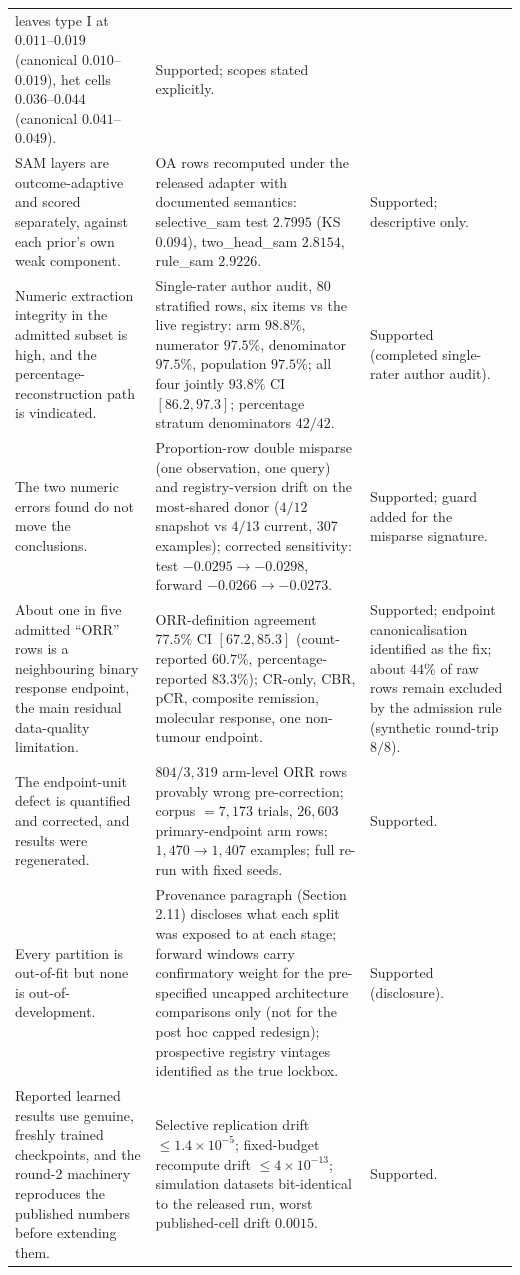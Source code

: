 \documentclass[11pt]{article}
\begin{document}
\begin{longtable}{p{} p{} p{}}
leaves type I at $0.011$--$0.019$ (canonical $0.010$--$0.019$), het cells
$0.036$--$0.044$ (canonical $0.041$--$0.049$). & Supported; scopes stated
explicitly. \\
SAM layers are outcome-adaptive and scored separately, against each prior's
own weak component. & OA rows recomputed under the released adapter with
documented semantics: selective\_sam test $2.7995$ (KS $0.094$), two\_head\_sam
$2.8154$, rule\_sam $2.9226$. & Supported; descriptive only. \\
Numeric extraction integrity in the admitted subset is high, and the
percentage-reconstruction path is vindicated. & Single-rater author audit, 80 stratified
rows, six items vs the live registry: arm $98.8\%$, numerator $97.5\%$,
denominator $97.5\%$, population $97.5\%$; all four jointly $93.8\%$ CI
$[86.2,97.3]$; percentage stratum denominators $42/42$. & Supported
(completed single-rater author audit). \\
The two numeric errors found do not move the conclusions. & Proportion-row
double misparse (one observation, one query) and registry-version drift on
the most-shared donor ($4/12$ snapshot vs $4/13$ current, 307 examples);
corrected sensitivity: test $-0.0295 \to -0.0298$, forward $-0.0266 \to
-0.0273$. & Supported; guard added for the misparse signature. \\
About one in five admitted ``ORR'' rows is a neighbouring binary response
endpoint, the main residual data-quality limitation. & ORR-definition
agreement $77.5\%$ CI $[67.2,85.3]$ (count-reported $60.7\%$,
percentage-reported $83.3\%$); CR-only, CBR, pCR, composite remission,
molecular response, one non-tumour endpoint. & Supported; endpoint
canonicalisation identified as the fix; about $44\%$ of raw rows remain
excluded by the admission rule (synthetic round-trip $8/8$). \\
The endpoint-unit defect is quantified and corrected, and results were
regenerated. & $804/3{,}319$ arm-level ORR rows provably wrong pre-correction;
corpus $= 7{,}173$ trials, $26{,}603$ primary-endpoint arm rows;
$1{,}470 \to 1{,}407$ examples; full re-run with fixed seeds. & Supported. \\
Every partition is out-of-fit but none is out-of-development. & Provenance
paragraph (Section 2.11) discloses what each split was exposed to at each
stage; forward windows carry confirmatory weight for the pre-specified
uncapped architecture comparisons only (not for the post hoc capped
redesign); prospective registry
vintages identified as the true lockbox. & Supported (disclosure). \\
Reported learned results use genuine, freshly trained checkpoints, and the
round-2 machinery reproduces the published numbers before extending them. &
Selective replication drift $\le 1.4\times10^{-5}$; fixed-budget recompute
drift $\le 4\times10^{-13}$; simulation datasets bit-identical to the
released run, worst published-cell drift $0.0015$. & Supported. \\
\bottomrule
\end{longtable}
\end{document}

